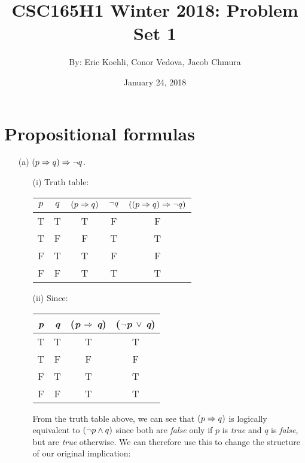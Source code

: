 \documentclass[12pt]{article}
\title{CSC165H1 Winter 2018: Problem Set 1}
\author{By: Eric Koehli, Conor Vedova, Jacob Chmura}
\date{January 24, 2018}
\begin{document}
\maketitle
\newpage

\section{Propositional formulas}
\begin{enumerate}
\item[(a)] $(p \Rightarrow q) \Rightarrow \neg q$.
  \begin{enumerate}
  \item[(i)] Truth table:

  \vspace{5pt}

  \begin{tabular}{c c c c c}

  $p$ & $q$ & $(p \Rightarrow q)$ & $\neg q$ & $((p \Rightarrow q) \Rightarrow \neg q)$ \\

  \hline

  T & T & T & F & F \\
  T & F & F & T & T \\
  F & T & T & F & F \\
  F & F & T & T & T \\
  \end{tabular}

  \vspace{15pt}
  \item[(ii)] Since:

  \vspace{5pt}

  \begin{tabular}{c c c c}

  \emph{p} & \emph{q} & (\emph{p} $\Rightarrow$ \emph{q}) & ($\neg$\emph{p} $\vee$ \emph{q}) \\

  \hline

  T & T & T & T \\
  T & F & F & F \\
  F & T & T & T \\
  F & F & T & T \\
  \end{tabular}

  \vspace{15pt}

  From the truth table above, we can see that $(p \Rightarrow q)$ is logically equivalent to $(\neg p \wedge q)$ since both are \emph{false} only if $p$ is \emph{true} and $q$ is \emph{false}, but are \emph{true} otherwise. We can therefore use this to change the structure of our original implication:


\end{enumerate}
\end{enumerate}
\end{document}
